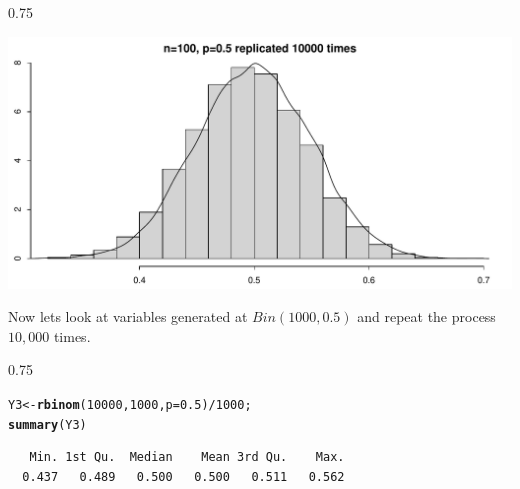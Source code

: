 \documentclass{beamer}\usepackage[]{graphicx}\usepackage[]{color}
\makeatletter
\newcommand{\hlnum}[1]{\textcolor[rgb]{0.2,0.2,0.2}{#1}}%
\newcommand{\hlopt}[1]{\textcolor[rgb]{0.102,0.102,0.102}{#1}}%
\newcommand{\hlstd}[1]{\textcolor[rgb]{0.102,0.102,0.102}{#1}}%
\newcommand{\hlkwb}[1]{\textcolor[rgb]{0.102,0.102,0.102}{#1}}%
\newcommand{\hlkwc}[1]{\textcolor[rgb]{0.2,0.2,0.2}{#1}}%
\newcommand{\hlkwd}[1]{\textcolor[rgb]{0.102,0.102,0.102}{\textbf{#1}}}%
\newenvironment{kframe}{%
 \def\at@end@of@kframe{}%
 \ifinner\ifhmode%
  \def\at@end@of@kframe{\end{minipage}}%
  \begin{minipage}{\columnwidth}%
 \fi\fi%
 \def\FrameCommand##1{\hskip\@totalleftmargin \hskip-\fboxsep
 \colorbox{shadecolor}{##1}\hskip-\fboxsep
     \hskip-\linewidth \hskip-\@totalleftmargin \hskip\columnwidth}%
 \MakeFramed {\advance\hsize-\width
   \@totalleftmargin\z@ \linewidth\hsize
   \@setminipage}}%
 {\par\unskip\endMakeFramed%
 \at@end@of@kframe}
\newenvironment{knitrout}{}{} %
\renewenvironment{knitrout}{\begin{spacing}{0.75}\begin{tiny}}{\end{tiny}\end{spacing}}
\makeatother
\begin{document}
\begin{frame}[fragile]

\begin{knitrout}\small
{}\color{fgcolor}

{\centering \includegraphics[width=0.89\linewidth]{figure/graphics-unnamed-chunk-17-1} 

}



\end{knitrout}

\end{frame}

\begin{frame}[fragile]

Now lets look at variables generated at $Bin(1000,0.5)$ and repeat the process $10,000$ times.

\begin{knitrout}\small
{}\color{fgcolor}\begin{kframe}
\begin{alltt}
\hlstd{Y3} \hlkwb{<-} \hlkwd{rbinom}\hlstd{(}\hlnum{10000}\hlstd{,} \hlnum{1000}\hlstd{,} \hlkwc{p}\hlstd{=}\hlnum{0.5}\hlstd{)}\hlopt{/} \hlnum{1000}\hlstd{;}
\hlkwd{summary}\hlstd{(Y3)}
\end{alltt}
\begin{verbatim}
   Min. 1st Qu.  Median    Mean 3rd Qu.    Max. 
  0.437   0.489   0.500   0.500   0.511   0.562 
\end{verbatim}
\end{kframe}
\end{knitrout}

\end{frame}
\end{document}
